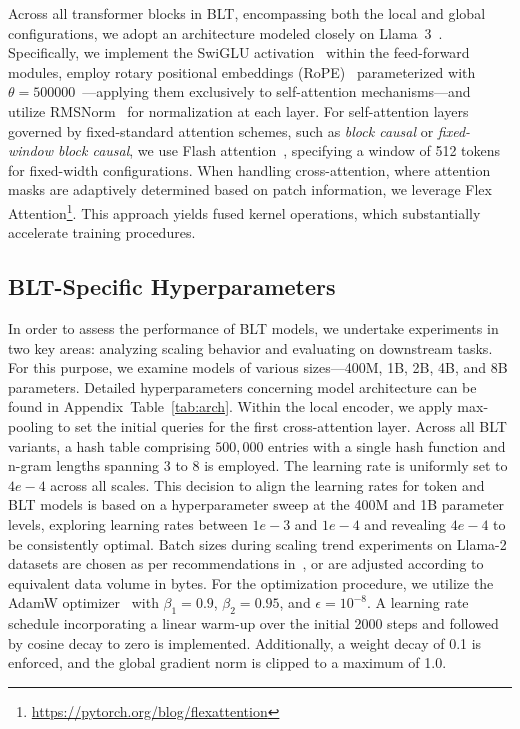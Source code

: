 Across all transformer blocks in {\textsc BLT}, encompassing both the local and global configurations, we adopt an architecture modeled closely on Llama~3~\citep{dubey2024llama}. Specifically, we implement the SwiGLU activation~\citep{swiglu} within the feed-forward modules, employ rotary positional embeddings (RoPE)~\citep{RoPe} parameterized with $\theta=500000$~\citep{xiong2024effective}—applying them exclusively to self-attention mechanisms—and utilize RMSNorm~\citep{RMSNorm} for normalization at each layer. For self-attention layers governed by fixed-standard attention schemes, such as \textit{block causal} or \textit{fixed-window block causal}, we use Flash attention~\citep{dao2022flashattention}, specifying a window of 512 tokens for fixed-width configurations. When handling cross-attention, where attention masks are adaptively determined based on patch information, we leverage Flex Attention\footnote{\url{https://pytorch.org/blog/flexattention}}. This approach yields fused kernel operations, which substantially accelerate training procedures.

\subsection{{\textsc BLT}-Specific Hyperparameters} In order to assess the performance of {\textsc BLT} models, we undertake experiments in two key areas: analyzing scaling behavior and evaluating on downstream tasks. For this purpose, we examine models of various sizes—400M, 1B, 2B, 4B, and 8B parameters. Detailed hyperparameters concerning model architecture can be found in Appendix~Table~\ref{tab:arch}. 
Within the local encoder, we apply max-pooling to set the initial queries for the first cross-attention layer. Across all {\textsc BLT} variants, a hash table comprising $500,000$ entries with a single hash function and n-gram lengths spanning 3 to 8 is employed. The learning rate is uniformly set to $4e-4$ across all scales. This decision to align the learning rates for token and {\textsc BLT} models is based on a hyperparameter sweep at the 400M and 1B parameter levels, exploring learning rates between $1e-3$ and $1e-4$ and revealing $4e-4$ to be consistently optimal. Batch sizes during scaling trend experiments on Llama-2 datasets are chosen as per recommendations in~\cite{dubey2024llama}, or are adjusted according to equivalent data volume in bytes. For the optimization procedure, we utilize the AdamW optimizer~\citep{adamw} with $\beta_1 = 0.9$, $\beta_2 = 0.95$, and $\epsilon=10^{-8}$. A learning rate schedule incorporating a linear warm-up over the initial 2000 steps and followed by cosine decay to zero is implemented. Additionally, a weight decay of 0.1 is enforced, and the global gradient norm is clipped to a maximum of 1.0.

